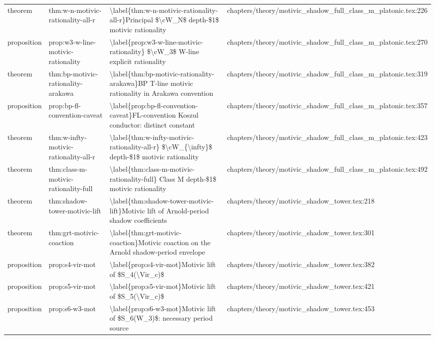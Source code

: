 \documentclass[11pt]{article}
\begin{document}
\begin{longtable}{L{0.10\textwidth}L{0.26\textwidth}L{0.42\textwidth}L{0.22\textwidth}}
theorem & thm:w-n-motivic-rationality-all-r & \textbackslash{}label\{thm:w-n-motivic-rationality-all-r\}Principal \$\textbackslash{}cW\_N\$ depth-\$1\$ motivic rationality & chapters/theory/motivic\_shadow\_full\_class\_m\_platonic.tex:226\\
proposition & prop:w3-w-line-motivic-rationality & \textbackslash{}label\{prop:w3-w-line-motivic-rationality\} \$\textbackslash{}cW\_3\$ W-line explicit rationality & chapters/theory/motivic\_shadow\_full\_class\_m\_platonic.tex:270\\
theorem & thm:bp-motivic-rationality-arakawa & \textbackslash{}label\{thm:bp-motivic-rationality-arakawa\}BP T-line motivic rationality in Arakawa convention & chapters/theory/motivic\_shadow\_full\_class\_m\_platonic.tex:319\\
proposition & prop:bp-fl-convention-caveat & \textbackslash{}label\{prop:bp-fl-convention-caveat\}FL-convention Koszul conductor: distinct constant & chapters/theory/motivic\_shadow\_full\_class\_m\_platonic.tex:357\\
theorem & thm:w-infty-motivic-rationality-all-r & \textbackslash{}label\{thm:w-infty-motivic-rationality-all-r\} \$\textbackslash{}cW\_\{\textbackslash{}infty\}\$ depth-\$1\$ motivic rationality & chapters/theory/motivic\_shadow\_full\_class\_m\_platonic.tex:423\\
theorem & thm:class-m-motivic-rationality-full & \textbackslash{}label\{thm:class-m-motivic-rationality-full\} Class M depth-\$1\$ motivic rationality & chapters/theory/motivic\_shadow\_full\_class\_m\_platonic.tex:492\\
theorem & thm:shadow-tower-motivic-lift & \textbackslash{}label\{thm:shadow-tower-motivic-lift\}Motivic lift of Arnold-period shadow coefficients & chapters/theory/motivic\_shadow\_tower.tex:218\\
theorem & thm:grt-motivic-coaction & \textbackslash{}label\{thm:grt-motivic-coaction\}Motivic coaction on the Arnold shadow-period envelope & chapters/theory/motivic\_shadow\_tower.tex:301\\
proposition & prop:s4-vir-mot & \textbackslash{}label\{prop:s4-vir-mot\}Motivic lift of \$S\_4(\textbackslash{}Vir\_c)\$ & chapters/theory/motivic\_shadow\_tower.tex:382\\
proposition & prop:s5-vir-mot & \textbackslash{}label\{prop:s5-vir-mot\}Motivic lift of \$S\_5(\textbackslash{}Vir\_c)\$ & chapters/theory/motivic\_shadow\_tower.tex:421\\
proposition & prop:s6-w3-mot & \textbackslash{}label\{prop:s6-w3-mot\}Motivic lift of \$S\_6(W\_3)\$: necessary period source & chapters/theory/motivic\_shadow\_tower.tex:453\\

\end{longtable}
\end{document}
